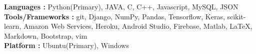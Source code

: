 

\textbf{Languages :}  Python(Primary), JAVA, C, C++, Javascript, MySQL, JSON \\
\textbf{Tools/Frameworks :} git, Django, NumPy, Pandas, Tensorflow, Keras, scikit-learn, Amazon Web Services, Heroku, Android Studio, Firebase, Matlab, \LaTeX, Markdown, Bootstrap, vim\\
\textbf{Platform :} Ubuntu(Primary), Windows